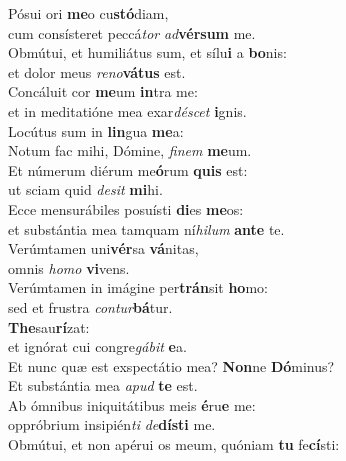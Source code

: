 \evenverse Pósui ori \textbf{me}o cu\textbf{stó}diam,~\*\\
\evenverse cum consísteret peccá\textit{tor} \textit{ad}\textbf{vér}\textbf{sum} me.\\
\oddverse Obmútui, et humiliátus sum, et sílu\textbf{i} a \textbf{bo}nis:~\*\\
\oddverse et dolor meus \textit{re}\textit{no}\textbf{vá}\textbf{tus} est.\\
\evenverse Concáluit cor \textbf{me}um \textbf{in}tra me:~\*\\
\evenverse et in meditatióne mea exar\textit{dé}\textit{scet} \textbf{i}gnis.\\
\oddverse Locútus sum in \textbf{lin}gua \textbf{me}a:~\*\\
\oddverse Notum fac mihi, Dómine, \textit{fi}\textit{nem} \textbf{me}um.\\
\evenverse Et númerum diérum me\textbf{ó}rum \textbf{quis} est:~\*\\
\evenverse ut sciam quid \textit{de}\textit{sit} \textbf{mi}hi.\\
\oddverse Ecce mensurábiles posuísti \textbf{di}es \textbf{me}os:~\*\\
\oddverse et substántia mea tamquam ní\textit{hi}\textit{lum} \textbf{an}\textbf{te} te.\\
\evenverse Verúmtamen uni\textbf{vér}sa \textbf{vá}nitas,~\*\\
\evenverse omnis \textit{ho}\textit{mo} \textbf{vi}vens.\\
\oddverse Verúmtamen in imágine per\textbf{trán}sit \textbf{ho}mo:~\*\\
\oddverse sed et frustra \textit{con}\textit{tur}\textbf{bá}tur.\\
\evenverse \textbf{The}sau\textbf{rí}zat:~\*\\
\evenverse et ignórat cui congre\textit{gá}\textit{bit} \textbf{e}a.\\
\oddverse Et nunc quæ est exspectátio mea? \textbf{Non}ne \textbf{Dó}minus?~\*\\
\oddverse Et substántia mea \textit{a}\textit{pud} \textbf{te} est.\\
\evenverse Ab ómnibus iniquitátibus meis \textbf{é}ru\textbf{e} me:~\*\\
\evenverse oppróbrium insipién\textit{ti} \textit{de}\textbf{dí}\textbf{sti} me.\\
\oddverse Obmútui, et non apérui os meum, quóniam \textbf{tu} fe\textbf{cí}sti:~\*\\
